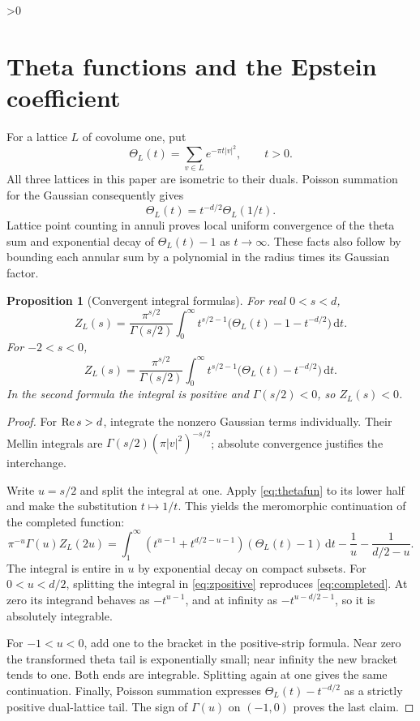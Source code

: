 \documentclass[11pt,a4paper]{article}
\newtheorem{proposition}[theorem]{Proposition}
\theoremstyle{definition}
\newcommand{\dd}{\,\mathrm d}
\newcommand{\abs}[1]{\lvert#1\rvert}
\numberwithin{equation}{section}
\let\originalsection\section
\renewcommand{\section}{\ifnum\value{section}>0\clearpage\fi\originalsection}
\begin{document}
\section{Theta functions and the Epstein coefficient}\label{sec:theta}
For a lattice $L$ of covolume one, put
\begin{equation}
 \Theta_L(t)=\sum_{v\in L}e^{-\pi t\abs v^2},\qquad t>0.
\end{equation}
All three lattices in this paper are isometric to their duals. Poisson summation for the Gaussian consequently gives
\begin{equation}\label{eq:thetafun}
 \Theta_L(t)=t^{-d/2}\Theta_L(1/t).
\end{equation}
Lattice point counting in annuli proves local uniform convergence of the theta sum and exponential decay of $\Theta_L(t)-1$ as $t\to\infty$. These facts also follow by bounding each annular sum by a polynomial in the radius times its Gaussian factor.

\begin{proposition}[Convergent integral formulas]\label{prop:zeta}
For real $0<s<d$,
\begin{equation}\label{eq:zpositive}
 Z_L(s)=\frac{\pi^{s/2}}{\Gamma(s/2)}
 \int_0^\infty t^{s/2-1}\bigl(\Theta_L(t)-1-t^{-d/2}\bigr)\dd t.
\end{equation}
For $-2<s<0$,
\begin{equation}\label{eq:znegative}
 Z_L(s)=\frac{\pi^{s/2}}{\Gamma(s/2)}
 \int_0^\infty t^{s/2-1}\bigl(\Theta_L(t)-t^{-d/2}\bigr)\dd t.
\end{equation}
In the second formula the integral is positive and $\Gamma(s/2)<0$, so $Z_L(s)<0$.
\end{proposition}
\begin{proof}
For $\mathop{\rm Re}s>d$, integrate the nonzero Gaussian terms individually. Their Mellin integrals are $\Gamma(s/2)(\pi\abs v^2)^{-s/2}$; absolute convergence justifies the interchange.

Write $u=s/2$ and split the integral at one. Apply \eqref{eq:thetafun} to its lower half and make the substitution $t\mapsto1/t$. This yields the meromorphic continuation of the completed function:
\begin{equation}\label{eq:completed}
 \pi^{-u}\Gamma(u)Z_L(2u)=
 \int_1^\infty(t^{u-1}+t^{d/2-u-1})(\Theta_L(t)-1)\dd t
 -\frac1u-\frac1{d/2-u}.
\end{equation}
The integral is entire in $u$ by exponential decay on compact subsets. For $0<u<d/2$, splitting the integral in \eqref{eq:zpositive} reproduces \eqref{eq:completed}. At zero its integrand behaves as $-t^{u-1}$, and at infinity as $-t^{u-d/2-1}$, so it is absolutely integrable.

For $-1<u<0$, add one to the bracket in the positive-strip formula. Near zero the transformed theta tail is exponentially small; near infinity the new bracket tends to one. Both ends are integrable. Splitting again at one gives the same continuation. Finally, Poisson summation expresses $\Theta_L(t)-t^{-d/2}$ as a strictly positive dual-lattice tail. The sign of $\Gamma(u)$ on $(-1,0)$ proves the last claim.
\end{proof}
\end{document}
